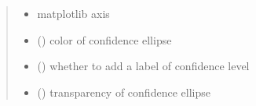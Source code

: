 \documentclass[letterpaper,10pt,english]{sphinxmanual}
\begin{document}
\begin{fulllineitems}
\begin{quote}
\begin{description}
\begin{itemize}
\item {} 
\sphinxAtStartPar
{} \textendash{} matplotlib axis

\item {} 
\sphinxAtStartPar
{} () \textendash{} color of confidence ellipse

\item {} 
\sphinxAtStartPar
{} () \textendash{} whether to add a label of confidence level

\item {} 
\sphinxAtStartPar
{} () \textendash{} transparency of confidence ellipse

\end{itemize}

\end{description}\end{quote}

\end{fulllineitems}

\end{document}

